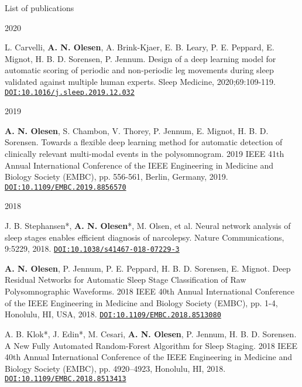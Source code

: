 \begin{rSection}{List of publications}
\begin{PublicationYear}{2020}{}{}{}
	    \item L. Carvelli, \textbf{A. N. Olesen}, A. Brink-Kjaer, E. B. Leary, P. E. Peppard, E. Mignot, H. B. D. Sorensen, P. Jennum. Design of a deep learning model for automatic scoring of periodic and non-periodic leg movements during sleep validated against multiple human experts. Sleep Medicine, 2020;69:109-119. \href{https://doi.org/10.1016/j.sleep.2019.12.032}{\texttt{DOI:10.1016/j.sleep.2019.12.032}}
	\end{PublicationYear}
    
	\begin{PublicationYear}{2019}{}{}{}
	    \item \textbf{A. N. Olesen}, S. Chambon, V. Thorey, P. Jennum, E. Mignot, H. B. D. Sorensen. Towards a flexible deep learning method for automatic detection of clinically relevant multi-modal events in the polysomnogram. 2019 IEEE 41th Annual International Conference of the IEEE Engineering in Medicine and Biology Society (EMBC), pp. 556-561, Berlin, Germany, 2019. \href{https://doi.org/10.1109/EMBC.2019.8856570}{\texttt{DOI:10.1109/EMBC.2019.8856570}}
	\end{PublicationYear}
	
	\begin{PublicationYear}{2018}{}{}{}
	    \item J. B. Stephansen\mbox{*}, \textbf{A. N. Olesen}\mbox{*}, M. Olsen, et al. Neural network analysis of sleep stages enables efficient diagnosis of narcolepsy. Nature Communications, 9:5229, 2018. \href{https://doi.org/10.1038/s41467-018-07229-3}{\texttt{DOI:10.1038/s41467-018-07229-3}}
	    
	    \item \textbf{A. N. Olesen}, P. Jennum, P. E. Peppard, H. B. D. Sorensen, E. Mignot. Deep Residual Networks for Automatic Sleep Stage Classification of Raw Polysomnographic Waveforms. 2018 IEEE 40th Annual International Conference of the IEEE Engineering in Medicine and Biology Society (EMBC), pp. 1-4, Honolulu, HI, USA, 2018. \href{https://doi.org/10.1109/EMBC.2018.8513080}{\texttt{DOI:10.1109/EMBC.2018.8513080}}
	    
	    \item A. B. Klok\mbox{*}, J. Edin\mbox{*}, M. Cesari, \textbf{A. N. Olesen}, P. Jennum, H. B. D. Sorensen. A New Fully Automated Random-Forest Algorithm for Sleep Staging. 2018 IEEE 40th Annual International Conference of the IEEE Engineering in Medicine and Biology Society (EMBC), pp. 4920–4923, Honolulu, HI, 2018. \href{https://doi.org/10.1109/EMBC.2018.8513413}{\texttt{DOI:10.1109/EMBC.2018.8513413}}
	    

\end{PublicationYear}
\end{rSection}
